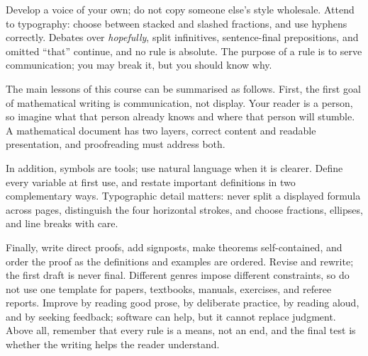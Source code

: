 \documentclass[11pt]{article}
\begin{document}
Develop a voice of your own; do not copy someone else's style wholesale. Attend to typography: choose between stacked and slashed fractions, and use hyphens correctly. Debates over \emph{hopefully}, split infinitives, sentence-final prepositions, and omitted ``that'' continue, and no rule is absolute. The purpose of a rule is to serve communication; you may break it, but you should know why.

The main lessons of this course can be summarised as follows. First, the first goal of mathematical writing is communication, not display. Your reader is a person, so imagine what that person already knows and where that person will stumble. A mathematical document has two layers, correct content and readable presentation, and proofreading must address both.

In addition, symbols are tools; use natural language when it is clearer. Define every variable at first use, and restate important definitions in two complementary ways. Typographic detail matters: never split a displayed formula across pages, distinguish the four horizontal strokes, and choose fractions, ellipses, and line breaks with care.

Finally, write direct proofs, add signposts, make theorems self-contained, and order the proof as the definitions and examples are ordered. Revise and rewrite; the first draft is never final. Different genres impose different constraints, so do not use one template for papers, textbooks, manuals, exercises, and referee reports. Improve by reading good prose, by deliberate practice, by reading aloud, and by seeking feedback; software can help, but it cannot replace judgment. Above all, remember that every rule is a means, not an end, and the final test is whether the writing helps the reader understand.
\end{document}
